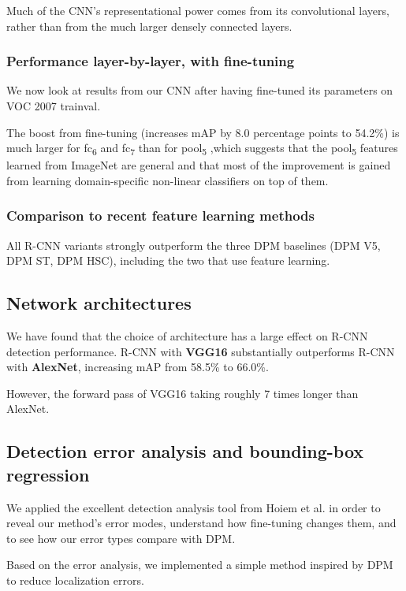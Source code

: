 \documentclass[a4paper,12pt]{article}
\begin{document}
Much of the CNN’s representational power comes from its convolutional layers, rather than from the much larger densely connected layers.

\subsubsection{Performance layer-by-layer, with fine-tuning}

We now look at results from our CNN after having fine-tuned its parameters on VOC 2007 trainval.

The boost from fine-tuning (increases mAP by 8.0 percentage points to 54.2\%) is much larger for fc\textsubscript{6} and fc\textsubscript{7} than for pool\textsubscript{5} ,which suggests that the pool\textsubscript{5} features learned from ImageNet are general and that most of the improvement is gained from learning domain-specific non-linear classifiers on top of them.

\subsubsection{Comparison to recent feature learning methods}

All R-CNN variants strongly outperform the three DPM baselines (DPM V5, DPM ST, DPM HSC), including the two that use feature learning.

\subsection{Network architectures}

We have found that the choice of architecture has a large effect on R-CNN detection performance. R-CNN with \textbf{VGG16} substantially outperforms R-CNN with \textbf{AlexNet}, increasing mAP from 58.5\% to 66.0\%.

However, the forward pass of VGG16 taking roughly 7 times longer than AlexNet.

\subsection{Detection error analysis and bounding-box regression}

We applied the excellent detection analysis tool from Hoiem et al. in order to reveal our method’s error modes, understand how fine-tuning changes them, and to see how our error types compare with DPM.

Based on the error analysis, we implemented a simple method inspired by DPM to reduce localization errors.
\end{document}

